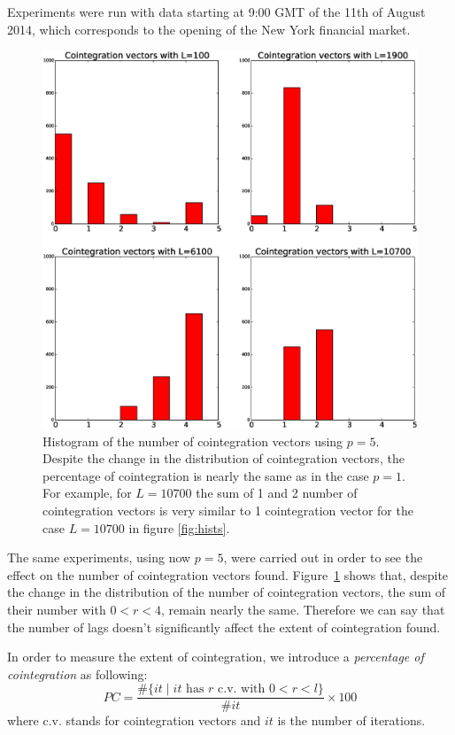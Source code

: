 Experiments were run with data starting at 9:00 GMT of the 11th of August 2014,
which corresponds to the opening of the New York financial market.


\begin{figure}[!h]
  \centering
  \includegraphics[width=\textwidth]{img/histCointVectorsp5}
  \caption{Histogram of the number of cointegration vectors using $p=5$. 
   Despite the change in the distribution of cointegration vectors, 
   the percentage of cointegration is nearly the same as in the case $p=1$. 
   For example, for $L=10700$ the sum of 1 and 2 number of cointegration
   vectors is very similar to 1 cointegration vector for the case $L=10700$
   in figure \ref{fig:hists}.}
   \label{fig:histsp5}
\end{figure}

The same experiments, using now $p=5$, were carried out in order to see the
effect on the number of cointegration vectors found. 
Figure~\ref{fig:histsp5} shows that, despite the change in the distribution
of the number of cointegration vectors, the sum of their number with $0<r<4$,
remain nearly the same. 
Therefore we can say that the number of lags doesn't significantly affect
the extent of cointegration found.

In order to measure the extent of cointegration, we introduce a
{\em percentage of cointegration\/} as following:
\begin{equation} \label{eq:pcoint}
PC = 
\frac{\#\{ it \mid \text{$it$ has $r$ c.v. with $0<r<l$}\}}
     {\#it}\times 100
\end{equation}
where c.v. stands for cointegration vectors and $it$ is the number of iterations.

